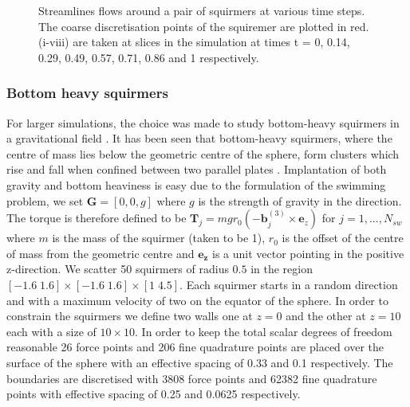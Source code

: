 \begin{figure}
\begin{subfigure}[b]{0.22\textwidth}
    \caption[]{\label{fig:PairH}}
\end{subfigure}
\caption[Streamlines flows around a pair of squirmers.]{\label{fig:Squiremer3DFlowPair}Streamlines flows around a pair of squirmers at various time steps. The coarse discretisation points of the squiremer are plotted in red. (i-viii) are taken at slices in the simulation at times t = 0, 0.14, 0.29, 0.49, 0.57, 0.71, 0.86 and 1 respectively.}
\end{figure}

\subsubsection{Bottom heavy squirmers}
For larger simulations, the choice was made to study bottom-heavy squirmers in a gravitational field \cite{Ruhle2020EmergentGravity,BrumleyStabilitySquirmers,Pedley2016SphericalMicro-organisms}. It has been seen that bottom-heavy squirmers, where the centre of mass lies below the geometric centre of the sphere, form clusters which rise and fall when confined between two parallel plates \cite{Ruhle2020EmergentGravity}. Implantation of both gravity and bottom heaviness is easy due to the formulation of the swimming problem, we set $\bm{G}=[0,0,g]$ where $g$ is the strength of gravity in the  direction. The torque is therefore defined to be $\bm{T}_j =  m g r_0 ( -\bm{b}_j^{(3)} \times \bm{e}_z)$ for $j=1,...,N_{sw}$ where $m$ is the mass of the squirmer (taken to be 1), $r_0$ is the offset of the centre of mass from the geometric centre and $\bm{e_z}$ is a unit vector pointing in the positive z-direction. We scatter 50 squirmers of radius $0.5$ in the region $[-1.6\; 1.6] \times [-1.6\; 1.6] \times [1\; 4.5]$. Each squirmer starts in a random direction and with a maximum velocity of two on the equator of the sphere. In order to constrain the squirmers we define two walls one at $z=0$ and the other at $z=10$ each with a size of $10 \times 10$. In order to keep the total scalar degrees of freedom reasonable 26 force points and 206 fine quadrature points are placed over the surface of the sphere with an effective spacing of 0.33 and 0.1 respectively. The boundaries are discretised with 3808 force points and 62382 fine quadrature points with effective spacing of 0.25 and 0.0625 respectively. 

